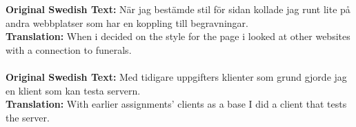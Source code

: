 \documentclass[twoside,twocolumn,a4paper,11pt,english]{article}
\begin{document}
\\
\\
\textbf{Original Swedish Text:} När jag bestämde stil för sidan kollade jag runt lite på andra webbplatser som har en koppling till begravningar.
\\
\textbf{Translation:} When i decided on the style for the page i looked at other websites with a connection to funerals.
\\
\\
\textbf{Original Swedish Text:} Med tidigare uppgifters klienter som grund gjorde jag en klient som kan testa servern.
\\
\textbf{Translation:} With earlier assignments' clients as a base I did a client that tests the server.
\end{document}
